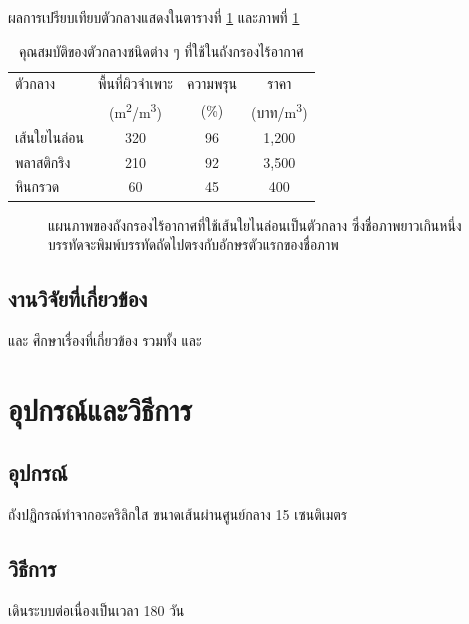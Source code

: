 \documentclass[thai]{kuthesis}
\begin{document}
ผลการเปรียบเทียบตัวกลางแสดงในตารางที่ \ref{tab:media} และภาพที่ \ref{fig:reactor}

\begin{table}[htbp]
  \caption{คุณสมบัติของตัวกลางชนิดต่าง ๆ ที่ใช้ในถังกรองไร้อากาศ}
  \label{tab:media}
  \centering
  \begin{tabular}{lccc}
    \toprule
    ตัวกลาง & พื้นที่ผิวจำเพาะ & ความพรุน & ราคา \\
            & (m\textsuperscript{2}/m\textsuperscript{3}) & (\%) & (บาท/m\textsuperscript{3}) \\
    \midrule
    เส้นใยไนล่อน & 320 & 96 & 1,200 \\
    พลาสติกริง   & 210 & 92 & 3,500 \\
    หินกรวด      & 60  & 45 & 400 \\
    \bottomrule
  \end{tabular}
\end{table}

\begin{figure}[htbp]
  \centering
  \caption{แผนภาพของถังกรองไร้อากาศที่ใช้เส้นใยไนล่อนเป็นตัวกลาง
           ซึ่งชื่อภาพยาวเกินหนึ่งบรรทัดจะพิมพ์บรรทัดถัดไปตรงกับอักษรตัวแรกของชื่อภาพ}
  \label{fig:reactor}
\end{figure}

\section{งานวิจัยที่เกี่ยวข้อง}

\textcite{chokprasin2003} และ \textcite{nabhadalung2005} ศึกษาเรื่องที่เกี่ยวข้อง
รวมทั้ง \textcite{buddhakulsomsiri2008} และ \textcite{seranevijaikitkhan2008}

\chapter{อุปกรณ์และวิธีการ}

\section{อุปกรณ์}
ถังปฏิกรณ์ทำจากอะคริลิกใส ขนาดเส้นผ่านศูนย์กลาง 15 เซนติเมตร

\section{วิธีการ}
เดินระบบต่อเนื่องเป็นเวลา 180 วัน
\end{document}
